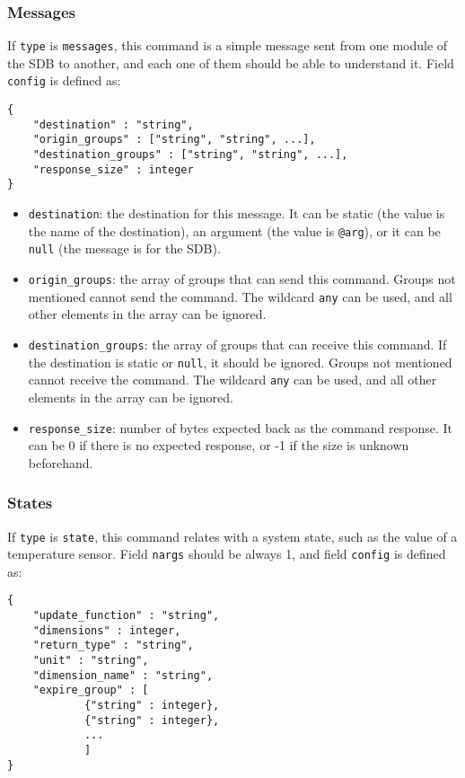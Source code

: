 \documentclass[12pt,a4paper]{report}
\begin{document}
\subsubsection*{Messages}
If \texttt{type} is \texttt{messages}, this command is a simple message sent from one module of the SDB to another, and each one of them should be able to understand it. Field \texttt{config} is defined as:
\begin{lstlisting}
{
	"destination" : "string",
	"origin_groups" : ["string", "string", ...],
	"destination_groups" : ["string", "string", ...],
	"response_size" : integer
}
\end{lstlisting}

\begin{itemize}
\item \texttt{destination}: the destination for this message. It can be static (the value is the name of the destination), an argument (the value is \texttt{@arg}), or it can be \texttt{null} (the message is for the SDB).
\item \texttt{origin\_groups}: the array of groups that can send this command. Groups not mentioned cannot send the command. The wildcard \texttt{any} can be used, and all other elements in the array can be ignored.
\item \texttt{destination\_groups}: the array of groups that can receive this command. If the destination is static or \texttt{null}, it should be ignored. Groups not mentioned cannot receive the command. The wildcard \texttt{any} can be used, and all other elements in the array can be ignored.
\item \texttt{response\_size}: number of bytes expected back as the command response. It can be 0 if there is no expected response, or -1 if the size is unknown beforehand.
\end{itemize}

\subsubsection*{States}
If \texttt{type} is \texttt{state}, this command relates with a system state, such as the value of a temperature sensor. Field \texttt{nargs} should be always 1, and field \texttt{config} is defined as:
\begin{lstlisting}
{
    "update_function" : "string",
    "dimensions" : integer,
    "return_type" : "string",
    "unit" : "string",
    "dimension_name" : "string",
    "expire_group" : [
    		{"string" : integer},
    		{"string" : integer},
    		...
    		]
}
\end{lstlisting}
\end{document}

